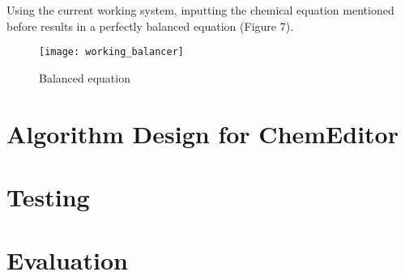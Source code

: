 \documentclass[a4paper,12pt]{article}
\begin{document}
Using the current working system, inputting the chemical equation mentioned before results in a perfectly balanced equation (Figure 7).

\begin{figure} [h]
	\centering
	\texttt{[image: working\_balancer]}
	\caption{Balanced equation}
	\label{fig:working_balancer}
\end{figure}

\newpage

\section{Algorithm Design for ChemEditor}

\newpage

\section{Testing}

\section{Evaluation}
\newpage
\end{document}
